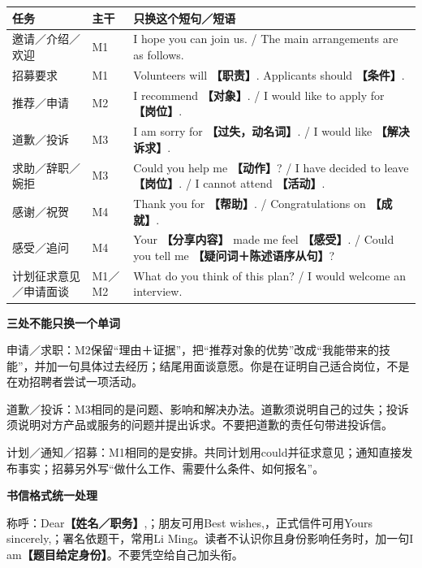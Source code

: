 \documentclass[11pt,a4paper,fontset=macnew]{ctexart}
\begin{document}
{\small
\begin{longtable}{L{30mm}L{17mm}L{106mm}}\toprule
\textbf{任务} & \textbf{主干} & \textbf{只换这个短句／短语}\\\midrule\endhead
邀请／介绍／欢迎 & M1 & I hope you can join us. / The main arrangements are as follows.\\
招募要求 & M1 & Volunteers will \textbf{【职责】}. Applicants should \textbf{【条件】}.\\
推荐／申请 & M2 & I recommend \textbf{【对象】}. / I would like to apply for \textbf{【岗位】}.\\
道歉／投诉 & M3 & I am sorry for \textbf{【过失，动名词】}. / I would like \textbf{【解决诉求】}.\\
求助／辞职／婉拒 & M3 & Could you help me \textbf{【动作】}? / I have decided to leave \textbf{【岗位】}. / I cannot attend \textbf{【活动】}.\\
感谢／祝贺 & M4 & Thank you for \textbf{【帮助】}. / Congratulations on \textbf{【成就】}.\\
感受／追问 & M4 & Your \textbf{【分享内容】} made me feel \textbf{【感受】}. / Could you tell me \textbf{【疑问词＋陈述语序从句】}?\\
计划征求意见／申请面谈 & M1／M2 & What do you think of this plan? / I would welcome an interview.\\
\bottomrule\end{longtable}
}
\par\vspace{5pt}\noindent\textbf{三处不能只换一个单词}\par\nopagebreak
申请／求职：M2保留“理由＋证据”，把“推荐对象的优势”改成“我能带来的技能”，并加一句具体过去经历；结尾用面谈意愿。你是在证明自己适合岗位，不是在劝招聘者尝试一项活动。

道歉／投诉：M3相同的是问题、影响和解决办法。道歉须说明自己的过失；投诉须说明对方产品或服务的问题并提出诉求。不要把道歉的责任句带进投诉信。

计划／通知／招募：M1相同的是安排。共同计划用could并征求意见；通知直接发布事实；招募另外写“做什么工作、需要什么条件、如何报名”。

\par\vspace{5pt}\noindent\textbf{书信格式统一处理}\par\nopagebreak
称呼：Dear\textbf{【姓名／职务】},；朋友可用Best wishes,，正式信件可用Yours sincerely,；署名依题干，常用Li Ming。读者不认识你且身份影响任务时，加一句I am\textbf{【题目给定身份】}。不要凭空给自己加头衔。
\end{document}
